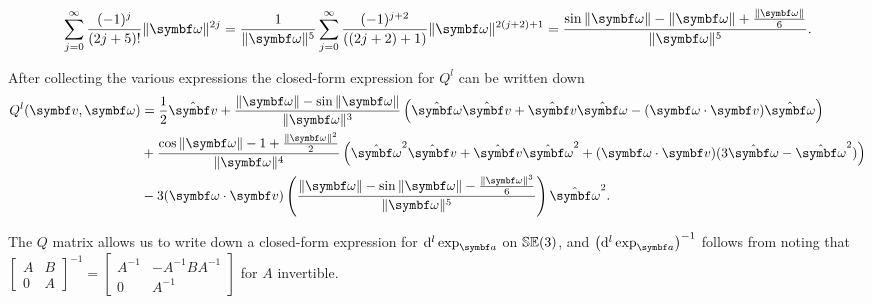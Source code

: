 \begin{equation}
  \sum_{j=0}^\infty \frac{(-1)^j}{(2j+5)!} \| \bomega \|^{2j} = \frac{1}{\|\bomega\|^5} \sum_{j=0}^\infty \frac{(-1)^{j+2}}{((2j+2)+1)} \| \bomega \|^{2(j+2)+1} = \frac{\sin \|\bomega \| - \| \bomega \| + \frac{\|\bomega\|}{6}}{\| \bomega \|^5}.
\end{equation}
\begin{important}
  After collecting the various expressions the closed-form expression for $Q^l$ can be written down
  \begin{equation}
    \label{eq:se3_q_expr}
    \begin{aligned}
      Q^l (\bv, \bomega) & = \frac{1}{2}\hat \bv + \frac{\| \bomega \| - \sin \| \bomega \|}{\| \bomega \|^3}\left(\hat \bomega \hat \bv + \hat \bv \hat \bomega - (\bomega \cdot \bv) \hat \bomega \right)                     \\
                         & + \frac{ \cos \| \bomega \| - 1 + \frac{\|\bomega\|^2}{2} }{\| \bomega \|^4} \left(\hat \bomega^2 \hat \bv + \hat \bv \hat \bomega^2 + (\bomega \cdot \bv) (3 \hat \bomega - \hat \bomega^2) \right) \\
                         & - 3(\bomega \cdot \bv) \left(  \frac{\|\bomega\| - \sin \|\bomega\| - \frac{\|\bomega\|^3}{6}}{\|\bomega\|^5} \right) \hat \bomega^2 .
    \end{aligned}
  \end{equation}
\end{important}
The $Q$ matrix allows us to write down a closed-form expression for $\mathrm{d}^l \exp_\a$ on ${\mathbb{SE}(3)}$, and $\left( \mathrm{d}^l \exp_\a\right)^{-1}$ follows from noting that $\begin{bmatrix} A & B \\ 0 & A \end{bmatrix}^{-1} = \begin{bmatrix} A^{-1} & -A^{-1} B A^{-1} \\ 0 & A^{-1} \end{bmatrix}$ for $A$ invertible.

